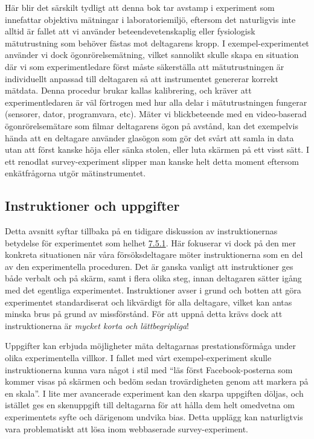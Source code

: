\documentclass[
]{book}
\begin{document}
Här blir det särskilt tydligt att denna bok tar avstamp i experiment som innefattar objektiva mätningar i laboratoriemiljö, eftersom det naturligvis inte alltid är fallet att vi använder beteendevetenskaplig eller fysiologisk mätutrustning som behöver fästas mot deltagarens kropp. I exempel-experimentet använder vi dock ögonrörelsemätning, vilket sannolikt skulle skapa en situation där vi som experimentledare först måste säkerställa att mätutrustningen är individuellt anpassad till deltagaren så att instrumentet genererar korrekt mätdata. Denna procedur brukar kallas kalibrering, och kräver att experimentledaren är väl förtrogen med hur alla delar i mätutrustningen fungerar (sensorer, dator, programvara, etc). Mäter vi blickbeteende med en video-baserad ögonrörelsemätare som filmar deltagarens ögon på avstånd, kan det exempelvis hända att en deltagare använder glasögon som gör det svårt att samla in data utan att först kanske höja eller sänka stolen, eller luta skärmen på ett visst sätt. I ett renodlat survey-experiment slipper man kanske helt detta moment eftersom enkätfrågorna utgör mätinstrumentet.

\hypertarget{sub07.6.5}{%
\subsection{Instruktioner och uppgifter}\label{sub07.6.5}}

Detta avsnitt syftar tillbaka på en tidigare diskussion av instruktionernas betydelse för experimentet som helhet \protect\hyperlink{sub07.5.1}{7.5.1}. Här fokuserar vi dock på den mer konkreta situationen när våra försöksdeltagare möter instruktionerna som en del av den experimentella proceduren. Det är ganska vanligt att instruktioner ges både verbalt och på skärm, samt i flera olika steg, innan deltagaren sätter igång med det egentliga experimentet. Instruktioner avser i grund och botten att göra experimentet standardiserat och likvärdigt för alla deltagare, vilket kan antas minska brus på grund av missförstånd. För att uppnå detta krävs dock att instruktionerna är \emph{mycket korta och lättbegripliga}!

Uppgifter kan erbjuda möjligheter mäta deltagarnas prestationsförmåga under olika experimentella villkor. I fallet med vårt exempel-experiment skulle instruktionerna kunna vara något i stil med ``läs först Facebook-posterna som kommer visas på skärmen och bedöm sedan trovärdigheten genom att markera på en skala''. I lite mer avancerade experiment kan den skarpa uppgiften döljas, och istället ges en skenuppgift till deltagarna för att hålla dem helt omedvetna om experimentets syfte och därigenom undvika bias. Detta upplägg kan naturligtvis vara problematiskt att lösa inom webbaserade survey-experiment.
\end{document}
